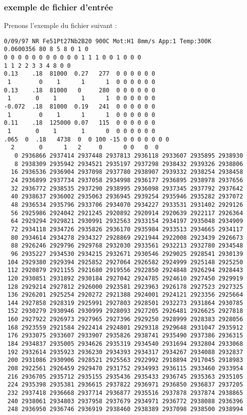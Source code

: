 \subsubsection{exemple de fichier d'entrée}
Prenons l'exemple du fichier suivant :
\begin{lstlisting}
0/09/97 NR Fe51Pt27Nb2B20 900C Mot:H1 8mm/s App:1 Temp:300K
0.0600356 80 8 5 8 0 1 0
0 0 0 0 0 0 0 0 0 0 0 1 1 1 0 0 1 0 0 0
1 1 2 2 3 3 4 8 0 0
0.13    .18  81000  0.27   277  0 0 0 0 0 0 
 1        0    1      1      1  0 0 0 0 0 0
0.13    .18  81000   0     280  0 0 0 0 0 0 
 1       0    1       1      1  0 0 0 0 0 0
-0.072  .18  81000  0.19   241  0 0 0 0 0 0 
 1        0    1      1      1  0 0 0 0 0 0
0.11    .18  125000 0.07   115  0 0 0 0 0 0 
 1       0    1       1      0  0 0 0 0 0 0
.065  0  .18   4738  0  0 100 -15 0 0 0 0 0 0 0
  2       0      1   2     0      0 0   0  0
   0 2936866 2937414 2937448 2937813 2936118 2933607 2935895 2938930
   8 2938309 2935942 2934521 2935197 2937298 2938432 2939326 2938806
  16 2936536 2936904 2937098 2937780 2938907 2939332 2938254 2938458
  24 2936899 2937734 2937058 2934998 2936177 2936895 2938978 2937656
  32 2936772 2938535 2937290 2938995 2936098 2937345 2937792 2937642
  40 2938637 2936002 2935063 2936945 2939254 2935946 2935282 2937072
  48 2936534 2935796 2933706 2934070 2934227 2933531 2931402 2929126
  56 2925986 2924042 2921245 2920892 2920914 2920639 2922117 2926364
  64 2929294 2929821 2930991 2932563 2933154 2934197 2935048 2934909
  72 2934118 2934726 2935826 2936170 2935984 2933513 2934665 2934117
  80 2934614 2934278 2934327 2928869 2921944 2922008 2923439 2926673
  88 2926246 2929796 2929768 2932030 2933561 2932213 2932780 2934548
  96 2935227 2934530 2934215 2932671 2930546 2929025 2928541 2930139
 104 2929380 2929394 2925852 2927064 2926582 2924999 2925148 2925250
 112 2920879 2921155 2921680 2919556 2922850 2924848 2926294 2928443
 120 2930851 2931892 2930184 2927042 2924785 2924610 2927450 2929919
 128 2929214 2927812 2926000 2923581 2923963 2926178 2927523 2927325
 136 2926201 2925254 2920272 2921388 2924001 2924121 2923356 2925664
 144 2927858 2928319 2925991 2927803 2928501 2932273 2931864 2930785
 152 2930279 2930946 2930999 2928093 2927205 2926481 2926625 2927818
 160 2927922 2926973 2927965 2927396 2929250 2928999 2928383 2928056
 168 2923559 2921584 2922414 2924801 2929318 2929648 2931047 2935912
 176 2933075 2933607 2933907 2935826 2938741 2935490 2937386 2936315
 184 2934837 2935005 2934626 2935319 2934540 2931694 2932804 2933068
 192 2932614 2935923 2936230 2934393 2934317 2934267 2934088 2932837
 200 2931086 2930906 2928521 2925563 2922992 2918894 2917045 2918983
 208 2922561 2926459 2929470 2931752 2934993 2936115 2933460 2933954
 216 2936705 2935712 2935155 2935436 2935433 2936745 2935363 2935105
 224 2935398 2935381 2936615 2937822 2936971 2936850 2936837 2937205
 232 2937418 2936668 2937714 2936877 2935516 2937878 2937874 2938865
 240 2938061 2934803 2937958 2937679 2934971 2936772 2938088 2936396
 248 2936950 2936746 2936919 2938460 2938389 2937098 2938500 2938994
\end{lstlisting}
